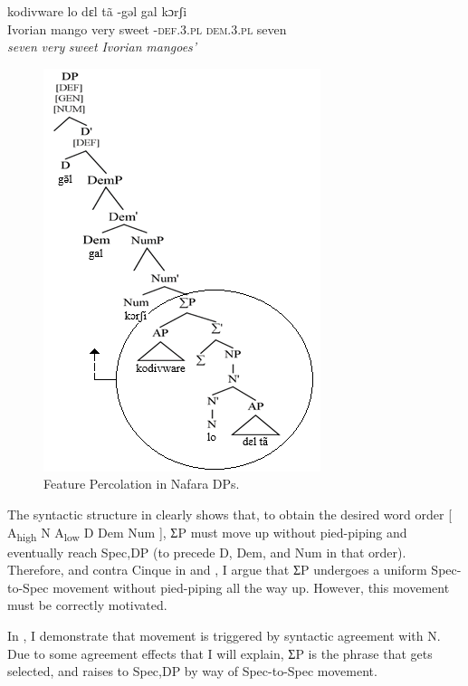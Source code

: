 \documentclass[output=paper]{langscibook}
\begin{document}
\ea\label{ex:baron:16}
kodivware lo dɛl tã -gəl gal kɔrʃi\\
   Ivorian mango very  sweet  -\textsc{def.3.pl} \textsc{dem.3.pl} seven  \\
 \textit{seven} \textit{very} \textit{sweet} \textit{Ivorian} \textit{mangoes’}
\z

\begin{figure}
\includegraphics[width=.7\textwidth]{figures/baron-img3.png}
\caption{Feature Percolation in Nafara DPs.}
\label{fig:baron:3}
\end{figure}

The syntactic structure in  clearly shows that, to obtain the desired word order [ A\textsubscript{high} N A\textsubscript{low} D Dem Num ], ƩP must move up without pied-piping and eventually reach Spec,DP (to precede D, Dem, and Num in that order). Therefore, and contra Cinque in  and , I argue that ƩP undergoes a uniform Spec-to-Spec movement without pied-piping all the way up. However, this movement must be correctly motivated. 

In , I demonstrate that movement is triggered by syntactic agreement with N. Due to some agreement effects that I will explain, ƩP is the phrase that gets selected, and raises to Spec,DP by way of Spec-to-Spec movement.
 
\end{document}
